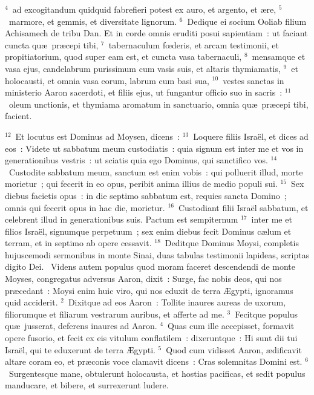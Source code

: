 ${}^{4}$~ad excogitandum quidquid fabrefieri potest ex auro, et argento, et \ae re,
${}^{5}$~marmore, et gemmis, et diversitate lignorum.
${}^{6}$~Dedique ei socium Ooliab filium Achisamech de tribu Dan. Et in corde omnis eruditi posui sapientiam~: ut faciant cuncta qu\ae\ pr\ae cepi tibi,
${}^{7}$~tabernaculum fœderis, et arcam testimonii, et propitiatorium, quod super eam est, et cuncta vasa tabernaculi,
${}^{8}$~mensamque et vasa ejus, candelabrum purissimum cum vasis suis, et altaris thymiamatis,
${}^{9}$~et holocausti, et omnia vasa eorum, labrum cum basi sua,
${}^{10}$~vestes sanctas in ministerio Aaron sacerdoti, et filiis ejus, ut fungantur officio suo in sacris~:
${}^{11}$~oleum unctionis, et thymiama aromatum in sanctuario, omnia qu\ae\ pr\ae cepi tibi, facient.


${}^{12}$~Et locutus est Dominus ad Moysen, dicens~:
${}^{13}$~Loquere filiis Isra\"el, et dices ad eos~: Videte ut sabbatum meum custodiatis~: quia signum est inter me et vos in generationibus vestris~: ut sciatis quia ego Dominus, qui sanctifico vos.
${}^{14}$~Custodite sabbatum meum, sanctum est enim vobis~: qui polluerit illud, morte morietur~; qui fecerit in eo opus, peribit anima illius de medio populi sui.
${}^{15}$~Sex diebus facietis opus~: in die septimo sabbatum est, requies sancta Domino~; omnis qui fecerit opus in hac die, morietur.
${}^{16}$~Custodiant filii Isra\"el sabbatum, et celebrent illud in generationibus suis. Pactum est sempiternum
${}^{17}$~inter me et filios Isra\"el, signumque perpetuum~; sex enim diebus fecit Dominus c\ae lum et terram, et in septimo ab opere cessavit.
${}^{18}$~Deditque Dominus Moysi, completis hujuscemodi sermonibus in monte Sinai, duas tabulas testimonii lapideas, scriptas digito Dei.
~\lettrine[lines=10,image=true,loversize=0.05,lraise=-0.03]{V}{}idens autem populus quod moram faceret descendendi de monte Moyses, congregatus adversus Aaron, dixit~: Surge, fac nobis deos, qui nos pr\ae cedant~: Moysi enim huic viro, qui nos eduxit de terra \AE gypti, ignoramus quid acciderit.
${}^{2}$~Dixitque ad eos Aaron~: Tollite inaures aureas de uxorum, filiorumque et filiarum vestrarum auribus, et afferte ad me.
${}^{3}$~Fecitque populus qu\ae\ jusserat, deferens inaures ad Aaron.
${}^{4}$~Quas cum ille accepisset, formavit opere fusorio, et fecit ex eis vitulum conflatilem~: dixeruntque~: Hi sunt dii tui Isra\"el, qui te eduxerunt de terra \AE gypti.
${}^{5}$~Quod cum vidisset Aaron, \ae dificavit altare coram eo, et pr\ae conis voce clamavit dicens~: Cras solemnitas Domini est.
${}^{6}$~Surgentesque mane, obtulerunt holocausta, et hostias pacificas, et sedit populus manducare, et bibere, et surrexerunt ludere.


